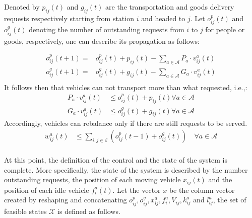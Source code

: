 Denoted by $p_{ij}(t)$ and $g_{ij}(t)$ are the transportation and goods delivery requests respectively starting from station $i$ and headed to $j$. Let $o^p_{ij}(t)$ and $o^g_{ij}(t)$ denoting the number of outstanding requests from $i$ to $j$ for people or goods, respectively, one can describe its propagation as follows:

\begin{equation}
	\begin{aligned}
		o^p_{ij}(t+1) =& o^p_{ij}(t) + p_{ij}(t) - \sum_{a \in \mathcal{A}} P_a\cdot v^a_{ij}(t)\\
			o^g_{ij}(t+1) =& o^g_{ij}(t) + g_{ij}(t) - \sum_{a \in \mathcal{A}} G_a \cdot v^a_{ij}(t)\\
	\end{aligned}
	\label{eq:demand_time}
\end{equation}
It follows then that vehicles can not transport more than what requested, i.e.,:
\begin{equation}
	\begin{aligned}
	 P_a\cdot v^a_{ij}(t) &\leq o^p_{ij}(t) + p_{ij}(t) \forall a \in \mathcal{A} \\
	 G_a \cdot v^a_{ij}(t) &\leq o^g_{ij}(t) + g_{ij}(t) \forall a \in \mathcal{A}
	\end{aligned}
	 \label{eq:no_more_than_request}
\end{equation}
Accordingly, vehicles can rebalance only if there are still requests to be served. 
\begin{equation}
	\begin{aligned}
	 	w^a_{ij}(t) &\leq \sum_{i,j \in \mathcal{E}} (o^p_{ij}(t-1) +o^g_{ij}(t) ) \quad\forall a \in \mathcal{A} \\
	\end{aligned}
	\label{eq:no_reb_than_request}
\end{equation}

At this point, the definition of the control and the state of the system is complete. More specifically, the state of the system is described by the number outstanding requests, the position of each moving vehicle $x_{ij}(t)$ and the position of each idle vehicle $f^a_{i}(t)$. Let the vector $x$ be the column vector created by reshaping and concatenating $o^p_{ij},o^g_{ij}, x_{ij}^a, f^a_{i}, V_{ij} , k^a_{ij} \text{ and } l^a_{ij}$, the set of feasible states $\mathcal{X}$ is defined as follows. 

